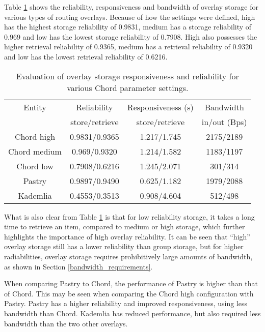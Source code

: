 Table \ref{tab_overlay_rel_resp_results} shows the reliability, responsiveness and bandwidth of overlay storage for various types of routing overlays. Because of how the settings were defined, high has the highest storage reliability of 0.9831, medium has a storage reliability of 0.969 and low has the lowest storage reliability of 0.7908. High also possesses the higher retrieval reliability of 0.9365, medium has a retrieval reliability of 0.9320 and low has the lowest retrieval reliability of 0.6216.
%
\begin{table}[htbp]
\centering
\begin{tabular}{|c|c|c|c|}
\hline
Entity       & Reliability   & Responsiveness (s) & Bandwidth\\
             &store/retrieve & store/retrieve     & in/out (Bps)\\
\hline
Chord high   & 0.9831/0.9365 &   1.217/1.745      & 2175/2189 \\
Chord medium & 0.969/0.9320  &   1.214/1.582      & 1183/1197\\
Chord low    & 0.7908/0.6216 &   1.245/2.071      & 301/314\\
Pastry       & 0.9897/0.9490 &   0.625/1.182      & 1979/2088\\
Kademlia     &   0.4553/0.3513      &  0.908/4.604  & 512/498\\
\hline
\end{tabular}
\caption{Evaluation of overlay storage responsiveness and reliability for various Chord parameter settings.}
\label{tab_overlay_rel_resp_results}
\end{table}

What is also clear from Table \ref{tab_overlay_rel_resp_results} is that for low reliability storage, it takes a long time to retrieve an item, compared to medium or high storage, which further highlights the importance of high overlay reliability. It can be seen that ``high'' overlay storage still has a lower reliability than group storage, but for higher radiabilities, overlay storage requires prohibitively large amounts of bandwidth, as shown in Section \ref{bandwidth_requirements}.

When comparing Pastry to Chord, the performance of Pastry is higher than that of Chord. This may be seen when comparing the Chord high configuration with Pastry. Pastry has a higher reliability and improved responsiveness, using less bandwidth than Chord. Kademlia has reduced performance, but also required less bandwidth than the two other overlays.


